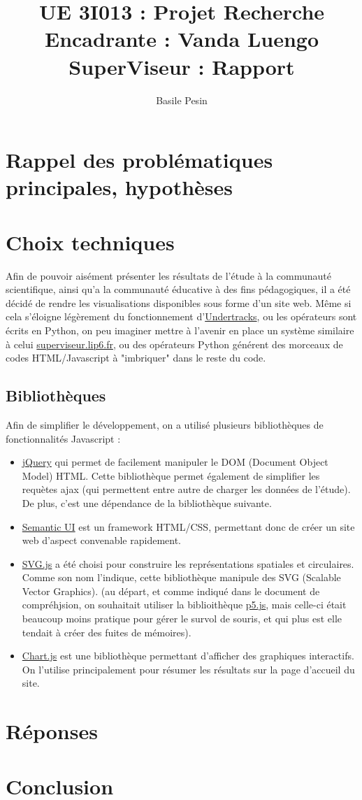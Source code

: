 \documentclass{article}
\title{UE 3I013 : Projet Recherche\\
    Encadrante : Vanda Luengo\\
    SuperViseur : Rapport}
\author{Basile Pesin}
\begin{document}
\maketitle
\newpage

\section{Rappel des problématiques principales, hypothèses}


\section{Choix techniques}
Afin de pouvoir aisément présenter les résultats de l'étude à la communauté scientifique, ainsi qu'a la communauté éducative à des fins pédagogiques, il a été décidé de rendre les visualisations disponibles sous forme d'un site web. Même si cela s'éloigne légèrement du fonctionnement d'\href{https://undertracks.imag.fr}{Undertracks}, ou les opérateurs sont écrits en Python, on peu imaginer mettre à l'avenir en place un système similaire à celui \href{http://superviseur.lip6.fr}{superviseur.lip6.fr}, ou des opérateurs Python générent des morceaux de codes HTML/Javascript à "imbriquer" dans le reste du code.

\subsection{Bibliothèques}
Afin de simplifier le développement, on a utilisé plusieurs bibliothèques de fonctionnalités Javascript :
\begin{itemize}
    \item \href{https://jquery.com/}{jQuery} qui permet de facilement manipuler le DOM (Document Object Model) HTML. Cette bibliothèque permet également de simplifier les requètes ajax (qui permettent entre autre de charger les données de l'étude). De plus, c'est une dépendance de la bibliothèque suivante.
    \item \href{https://semantic-ui.com/}{Semantic UI} est un framework HTML/CSS, permettant donc de créer un site web d'aspect convenable rapidement.
    \item \href{http://svgjs.com/}{SVG.js} a été choisi pour construire les représentations spatiales et circulaires. Comme son nom l'indique, cette bibliothèque manipule des SVG (Scalable Vector Graphics). (au départ, et comme indiqué dans le document de compréhjsion, on souhaitait utiliser la biblioithèque \href{https://p5js.org/}{p5.js}, mais celle-ci était beaucoup moins pratique pour gérer le survol de souris, et qui plus est elle tendait à créer des fuites de mémoires).
    \item \href{http://www.chartjs.org/}{Chart.js} est une bibliothèque permettant d'afficher des graphiques interactifs. On l'utilise principalement pour résumer les résultats sur la page d'accueil du site.
\end{itemize}

\section{Réponses}

\section{Conclusion}

{}

\end{document}
